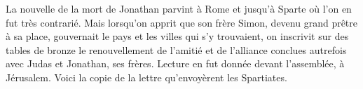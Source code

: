 La nouvelle de la mort de Jonathan parvint à Rome et jusqu’à Sparte
	où l’on en fut très contrarié.
Mais lorsqu’on apprit que son frère Simon, devenu grand prêtre à sa place,
	gouvernait le pays et les villes qui s’y trouvaient,
	on inscrivit sur des tables de bronze
		le renouvellement de l’amitié et de l’alliance
		conclues autrefois avec Judas et Jonathan, ses frères.
Lecture en fut donnée devant l’assemblée, à Jérusalem.
Voici la copie de la lettre qu’envoyèrent les Spartiates.
